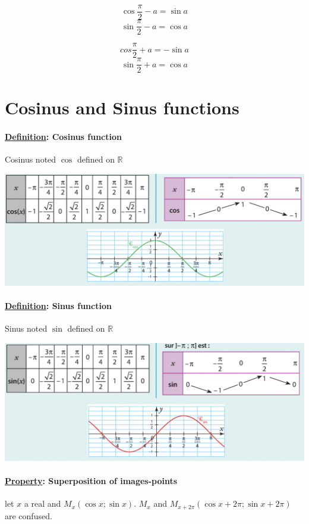 \documentclass{article}
\begin{document}
$$\cos{\frac{\pi}{2}-a} = \sin{a}$$
$$\sin{\frac{\pi}{2}-a} = \cos{a}$$

$$cos{\frac{\pi}{2} + a} = -\sin{a}$$
$$\sin{\frac{\pi}{2} + a} = \cos{a}$$
\section{Cosinus and Sinus functions}
\paragraph*{\underline{Definition}: Cosinus function}
Cosinus noted $\cos$ defined on $\mathbb{R}$
\begin{center}
    \includegraphics[scale=0.31]{cos_tables.png}
\end{center}
\paragraph*{\underline{Definition}: Sinus function}
Sinus noted $\sin$ defined on $\mathbb{R}$
\begin{center}
    \includegraphics[scale=0.31]{sin_tables.png}
\end{center}
\paragraph{\underline{Property}: Superposition of images-points}
let $x$ a real and $M_x(\cos{x};\sin{x})$. $M_x$ and $M_{x+2\pi}(\cos{x+2\pi};\sin{x+2\pi})$
are confused.
\end{document}
